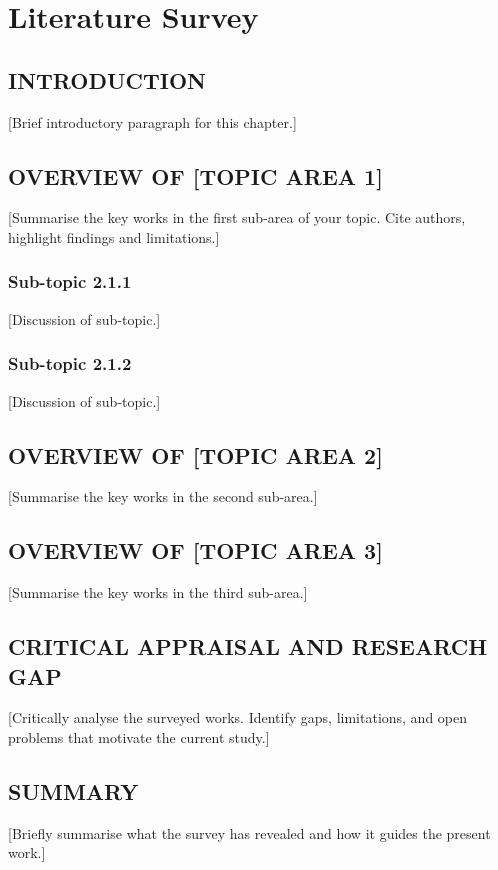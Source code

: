 
\chapter{Literature Survey}

\section{INTRODUCTION}

[Brief introductory paragraph for this chapter.]

\section{OVERVIEW OF [TOPIC AREA 1]}

[Summarise the key works in the first sub-area of your topic.
Cite authors, highlight findings and limitations.]

\subsection{Sub-topic 2.1.1}

[Discussion of sub-topic.]

\subsection{Sub-topic 2.1.2}

[Discussion of sub-topic.]

\section{OVERVIEW OF [TOPIC AREA 2]}

[Summarise the key works in the second sub-area.]

\section{OVERVIEW OF [TOPIC AREA 3]}

[Summarise the key works in the third sub-area.]

\section{CRITICAL APPRAISAL AND RESEARCH GAP}

[Critically analyse the surveyed works. Identify gaps,
limitations, and open problems that motivate the current study.]

\section{SUMMARY}

[Briefly summarise what the survey has revealed and how it
guides the present work.]
